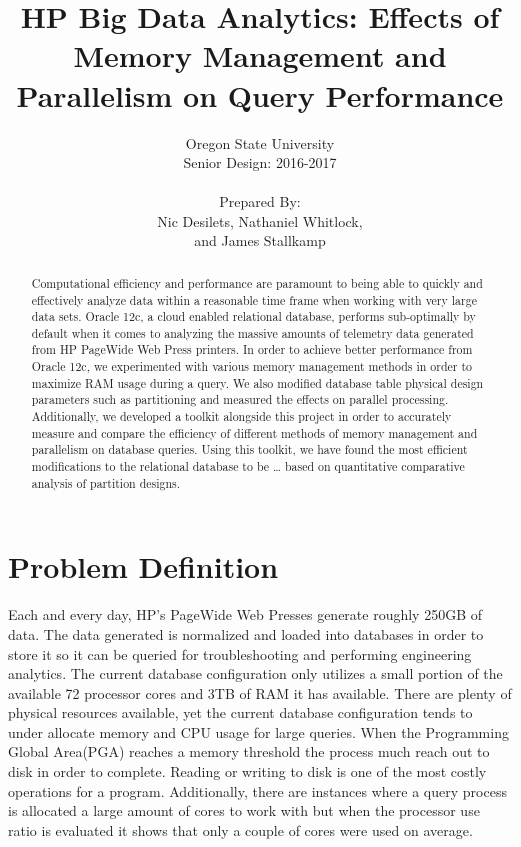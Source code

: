 \documentclass[draftclsnofoot, onecolumn, 10pt]{IEEEtran}
\title{\huge HP Big Data Analytics: Effects of Memory Management and Parallelism on Query Performance}
\author{Oregon State University\\Senior Design: 2016-2017\\\\Prepared By:\\Nic Desilets, Nathaniel Whitlock,\\ and James Stallkamp}
\begin{document}
\begin{titlingpage}
    \maketitle
    
    \begin{abstract}
		Computational efficiency and performance are paramount to being able to quickly and effectively analyze data within a reasonable time frame when working with very large data sets.
		Oracle 12c, a cloud enabled relational database, performs sub-optimally by default when it comes to analyzing the massive amounts of telemetry data generated from HP PageWide Web Press printers.
		In order to achieve better performance from Oracle 12c, we experimented with various memory management methods in order to maximize RAM usage during a query.
		We also modified database table physical design parameters such as partitioning and measured the effects on parallel processing.
		Additionally, we developed a toolkit alongside this project in order to accurately measure and compare the efficiency of different methods of memory management and parallelism on database queries.
		Using this toolkit, we have found the most efficient modifications to the relational database to be … based on quantitative comparative analysis of partition designs.
    \end{abstract}
\end{titlingpage}


\section*{Problem Definition}
Each and every day, HP’s PageWide Web Presses generate roughly 250GB of data.
The data generated is normalized and loaded into databases in order to store it so it can be queried for troubleshooting and performing engineering analytics.
The current database configuration only utilizes a small portion of the available 72 processor cores and 3TB of RAM it has available.
There are plenty of physical resources available, yet the current database configuration tends to under allocate memory and CPU usage for large queries.
When the Programming Global Area(PGA) reaches a memory threshold the process much reach out to disk in order to complete.
Reading or writing to disk is one of the most costly operations for a program.
Additionally, there are instances where a query process is allocated a large amount of cores to work with but when the processor use ratio is evaluated it shows that only a couple of cores were used on average.
\end{document}
